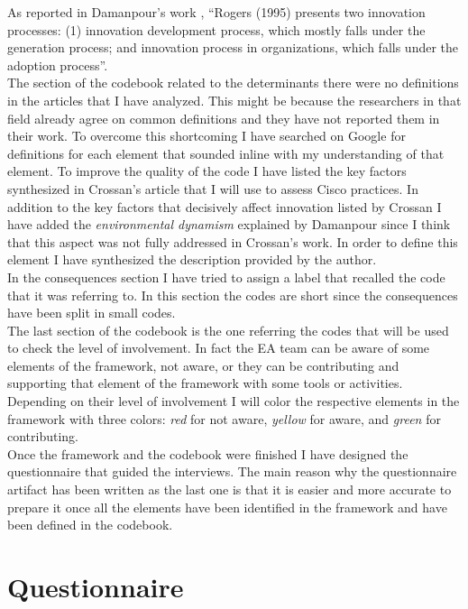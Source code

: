 As reported in Damanpour's work \citep{damanpour2006}, ``Rogers (1995) presents two innovation processes: (1) innovation development process, which mostly falls under the generation process; and innovation process in organizations, which falls under the adoption process''.
\\ %
The section of the codebook related to the determinants there were no definitions in the articles that I have analyzed. This might be because the researchers in that field already agree on common definitions and they have not reported them in their work.
To overcome this shortcoming I have searched on Google for definitions for each element that sounded inline with my understanding of that element. To improve the quality of the code I have listed the key factors synthesized in Crossan's article \citep{crossan2010} that I will use to assess Cisco practices.
In addition to the key factors that decisively affect innovation listed by Crossan I have added the \textit{environmental dynamism} explained by Damanpour \citep{damanpour1998} since I think that this aspect was not fully addressed in Crossan's work. In order to define this element I have synthesized the description provided by the author.
\\ %
In the consequences section I have tried to assign a label that recalled the code that it was referring to. In this section the codes are short since the consequences have been split in small codes.
\\ %
The last section of the codebook is the one referring the codes that will be used to check the level of involvement. In fact the EA team can be aware of some elements of the framework, not aware, or they can be contributing and supporting that element of the framework with some tools or activities. Depending on their level of involvement I will color the respective elements in the framework with three colors: \textit{red} for not aware, \textit{yellow} for aware, and \textit{green} for contributing.
\\
Once the framework and the codebook were finished I have designed the questionnaire that guided the interviews. The main reason why the questionnaire artifact has been written as the last one is that it is easier and more accurate to prepare it once all the elements have been identified in the framework and have been defined in the codebook.

\section{Questionnaire}

